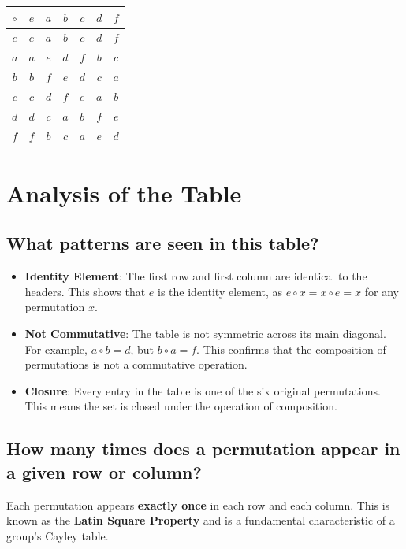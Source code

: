 \documentclass[10pt]{article}
\theoremstyle{definition}
\theoremstyle{plain}
\numberwithin{equation}{section}
\begin{document}
\begin{center}
  \begin{tabular}{|c||c|c|c|c|c|c|}
    \hline
    \textbf{$\circ$} & \textbf{$e$} & \textbf{$a$} & \textbf{$b$} & \textbf{$c$} & \textbf{$d$} & \textbf{$f$} \\
    \hline\hline
    \textbf{$e$} & $e$ & $a$ & $b$ & $c$ & $d$ & $f$ \\
    \hline
    \textbf{$a$} & $a$ & $e$ & $d$ & $f$ & $b$ & $c$ \\
    \hline
    \textbf{$b$} & $b$ & $f$ & $e$ & $d$ & $c$ & $a$ \\
    \hline
    \textbf{$c$} & $c$ & $d$ & $f$ & $e$ & $a$ & $b$ \\
    \hline
    \textbf{$d$} & $d$ & $c$ & $a$ & $b$ & $f$ & $e$ \\
    \hline
    \textbf{$f$} & $f$ & $b$ & $c$ & $a$ & $e$ & $d$ \\
    \hline
  \end{tabular}
\end{center}

\section*{Analysis of the Table}

\subsection*{What patterns are seen in this table?}
\begin{itemize}
  \item \textbf{Identity Element}: The first row and first column are identical to the headers. This shows that $e$ is the identity element, as $e \circ x = x \circ e = x$ for any permutation $x$.
  \item \textbf{Not Commutative}: The table is not symmetric across its main diagonal. For example, $a \circ b = d$, but $b \circ a = f$. This confirms that the composition of permutations is not a commutative operation.
  \item \textbf{Closure}: Every entry in the table is one of the six original permutations. This means the set is closed under the operation of composition.
\end{itemize}

\subsection*{How many times does a permutation appear in a given row or column?}
Each permutation appears \textbf{exactly once} in each row and each column. This is known as the \textbf{Latin Square Property} and is a fundamental characteristic of a group's Cayley table.
\end{document}
